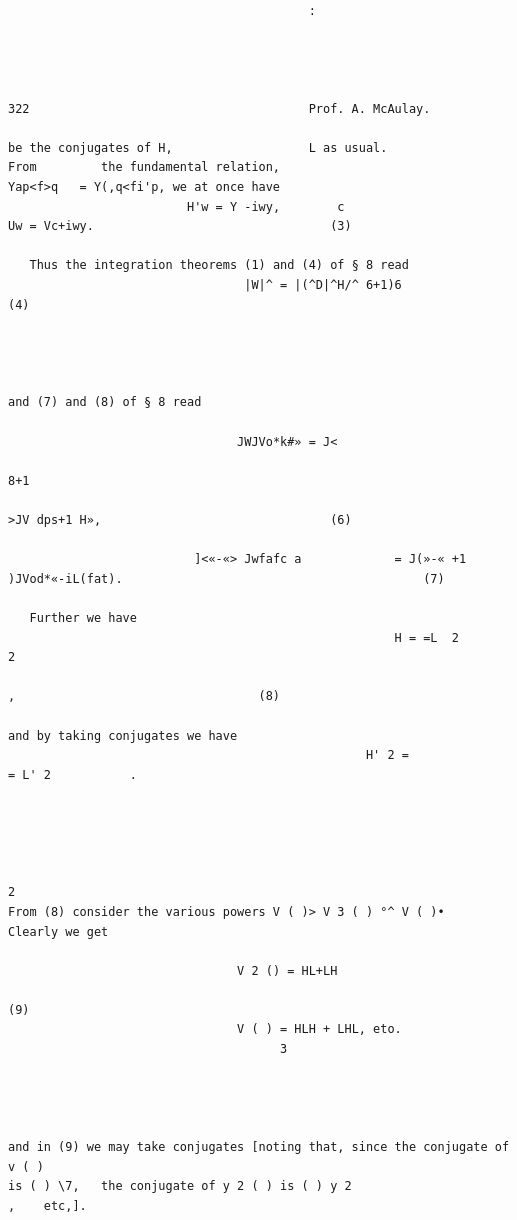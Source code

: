 \documentclass[10pt]{article}
\begin{document}
\begin{verbatim}

                                          :




322                                       Prof. A. McAulay.

be the conjugates of H,                   L as usual.                              From         the fundamental relation,
Yap<f>q   = Y(,q<fi'p, we at once have
                         H'w = Y -iwy,        c                               Uw = Vc+iwy.                                 (3)

   Thus the integration theorems (1) and (4) of § 8 read
                                 |W|^ = |(^D|^H/^ 6+1)6                                                                    (4)




and (7) and (8) of § 8 read

                                JWJVo*k#» = J<
                                                                      8+1
                                                                              >JV dps+1 H»,                                (6)

                          ]<«-«> Jwfafc a             = J(»-« +1 )JVod*«-iL(fat).                                          (7)

   Further we have
                                                      H = =L  2                     2
                                                                                        ,                                  (8)

and by taking conjugates we have
                                                  H' 2 =                   = L' 2           .




                                                                          2
From (8) consider the various powers V ( )> V 3 ( ) °^ V ( )•                                                 Clearly we get

                                V 2 () = HL+LH
                                                                                                                           (9)
                                V ( ) = HLH + LHL, eto.
                                      3




and in (9) we may take conjugates [noting that, since the conjugate of v ( )
is ( ) \7,   the conjugate of y 2 ( ) is ( ) y 2                      ,    etc,].


\end{verbatim}
\end{document}

